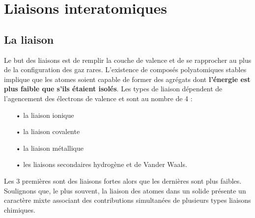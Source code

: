 
\chapter{Liaisons interatomiques}
\section{La liaison}
	Le but des liaisons est de remplir la couche de valence et de se rapprocher au plus de la configuration des gaz rares. L'existence de composés polyatomiques stables implique que les atomes soient capable de former des agrégats dont \textbf{l'énergie est plus faible que s'ils étaient isolés}. Les types de liaison dépendent de l'agencement des électrons de valence et sont au nombre de 4 : \\

	\begin{itemize}
		\item[•] la liaison ionique
		\item[•] la liaison covalente
		\item[•] la liaison métallique
		\item[•] les liaisons secondaires hydrogène et de Vander Waals. \\
	\end{itemize}
	
	Les 3 premières sont des liaisons fortes alors que les dernières sont plus faibles. Soulignons que, le plus souvent, la liaison des atomes dans un solide présente un caractère mixte associant des contributions simultanées de plusieurs types liaisons chimiques.
	
